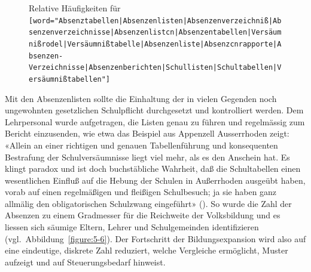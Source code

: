 \begin{figure}[!ht]
    \caption{Relative Häufigkeiten für \texttt{[word=\string"\phantom{}Ab\-senz\-ta\-bellen|\-Abs\-enz\-en\-li\-sten|\-Ab\-senz\-en\-ver\-zeich\-niß|Absenz\-en\-ver\-zeic\-hnisse|\-Ab\-senz\-en\-list\-cn|\-Ab\-sen\-zen\-tab\-el\-len|\-Ver\-säum\-niß\-ro\-del|\-Ver\-säum\-niß\-ta\-belle|\-Ab\-senz\-en\-lis\-te|\-Ab\-senz\-cn\-rapporte|\-Ab\-senz\-en-Ver\-zeich\-nisse|\-Ab\-senz\-en\-be\-rich\-ten|\-Schul\-listen|\-Schul\-ta\-bellen|\-Ver\-säum\-niß\-ta\-bellen"]}}
    \label{figure:5-5}
\end{figure}

Mit den Absenzenlisten sollte die Einhaltung der in vielen Gegenden noch ungewohnten gesetzlichen Schulpflicht durchgesetzt und kontrolliert werden. Dem Lehrpersonal wurde aufgetragen, die Listen genau zu führen und regelmässig zum Bericht einzusenden, wie etwa das Beispiel aus Appenzell Ausserrhoden zeigt: «Allein an einer richtigen und genauen Tabellenführung und konsequenten Bestrafung der Schulversäumnisse liegt viel mehr, als es den Anschein hat. Es klingt paradox und ist doch buchstäbliche Wahrheit, daß die Schultabellen einen wesentlichen Einfluß auf die Hebung der Schulen in Außerrhoden ausgeübt haben, vorab auf einen regelmäßigen und fleißigen Schulbesuch; ja sie haben ganz allmälig den obligatorischen Schulzwang eingeführt» (\cite[68]{noauthor_neuesten_1868}). So wurde die Zahl der Absenzen zu einem Gradmesser für die Reichweite der Volksbildung und es liessen sich säumige Eltern, Lehrer und Schulgemeinden identifizieren (vgl.~Abbildung~\ref{figure:5-6}). Der Fortschritt der Bildungsexpansion wird also auf eine eindeutige, diskrete Zahl reduziert, welche Vergleiche ermöglicht, Muster aufzeigt und auf Steuerungsbedarf hinweist.

